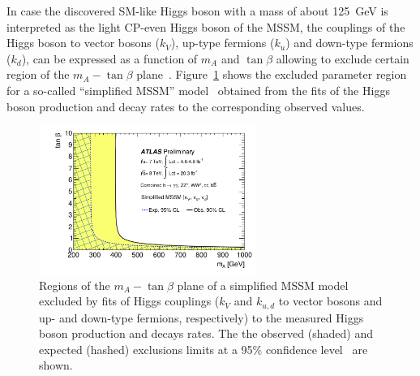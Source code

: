 In case the discovered SM-like Higgs boson with a mass of about 125~GeV is interpreted as the light CP-even Higgs boson of the MSSM, the couplings of the Higgs boson 
to vector bosons ($k_V$), up-type fermions ($k_u$) and down-type fermions ($k_d$), can be expressed as a function of  $m_A $ and $\tan\beta$
allowing to exclude certain region of the  $m_A - \tan\beta$ plane~\cite{AtlasConstraint}. Figure~\ref{fig:ex1} shows the 
excluded parameter region for a so-called ``simplified MSSM'' model~\cite{sympleMSSM1,sympleMSSM2}
obtained from the fits of the  Higgs boson production and decay rates to the corresponding observed values.

 
\begin{figure}[!tp]
     \begin{center}

            \includegraphics[width=0.63\textwidth]{figure/limits/constraintAtlas.pdf}

    \end{center}
    \caption{Regions of the  $m_A - \tan\beta$ plane of a simplified MSSM model~\cite{sympleMSSM1,sympleMSSM2} 
	excluded by fits of Higgs couplings ($k_V$ and $k_{u,d}$ to vector bosons and up- and down-type fermions, respectively)
	to the measured  Higgs boson production and decays rates. The the observed (shaded) and expected (hashed)  exclusions 
	limits at a 95\% confidence level~\cite{AtlasConstraint} are shown.}

   \label{fig:ex1}
\end{figure}

